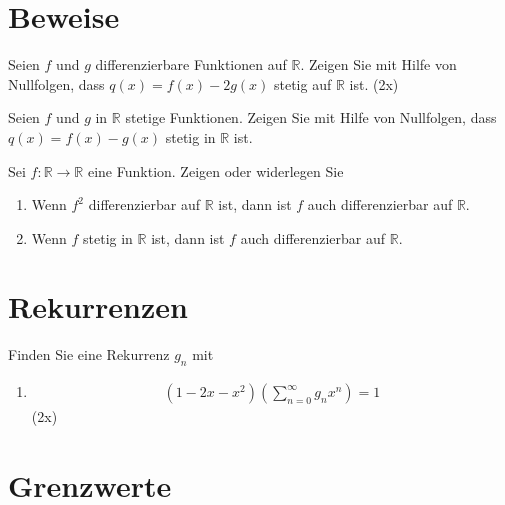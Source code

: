 \documentclass{article}
\begin{document}
\section*{Beweise}

Seien $f$ und $g$ differenzierbare Funktionen auf $\mathbb{R}$. Zeigen Sie mit Hilfe von Nullfolgen, dass $q(x) = f(x) - 2g(x)$ stetig auf $\mathbb{R}$ ist. (2x)

Seien $f$ und $g$ in $\mathbb{R}$ stetige Funktionen. Zeigen Sie mit Hilfe von Nullfolgen, dass $q(x) = f(x) - g(x)$ stetig in $\mathbb{R}$ ist.

Sei $f : \mathbb{R} \to \mathbb{R}$ eine Funktion. Zeigen oder widerlegen Sie
\begin{enumerate}
    \item Wenn $f^2$ differenzierbar auf $\mathbb{R}$ ist, dann ist $f$ auch differenzierbar auf $\mathbb{R}$.
    \item Wenn $f$ stetig in $\mathbb{R}$ ist, dann ist $f$ auch differenzierbar auf $\mathbb{R}$.
\end{enumerate}

\section*{Rekurrenzen}

Finden Sie eine Rekurrenz $g_n$ mit

\begin{enumerate}
    \item \begin{align*}
        (1 - 2x - x^2)\left(\sum_{n=0}^{\infty}g_nx^n\right) = 1
    \end{align*} (2x)
\end{enumerate}

\section*{Grenzwerte}
\end{document}
